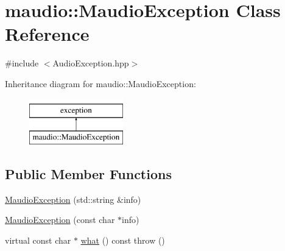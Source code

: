 \hypertarget{classmaudio_1_1MaudioException}{\section{maudio\-:\-:Maudio\-Exception Class Reference}
\label{classmaudio_1_1MaudioException}
}


{\ttfamily \#include $<$Audio\-Exception.\-hpp$>$}

Inheritance diagram for maudio\-:\-:Maudio\-Exception\-:\begin{figure}[H]
\begin{center}
\leavevmode
\includegraphics[height=2.000000cm]{classmaudio_1_1MaudioException}
\end{center}
\end{figure}
\subsection*{Public Member Functions}
\begin{DoxyCompactItemize}
\item 
\hyperlink{classmaudio_1_1MaudioException_a649972ea7610ff77dff19bb488b56069}{Maudio\-Exception} (std\-::string \&info)
\item 
\hyperlink{classmaudio_1_1MaudioException_a10d040493ff272ae625ab42876df6515}{Maudio\-Exception} (const char $\ast$info)
\item 
virtual const char $\ast$ \hyperlink{classmaudio_1_1MaudioException_a50ceb3db2d26444b3daa686c4594ca22}{what} () const   throw ()
\end{DoxyCompactItemize}


